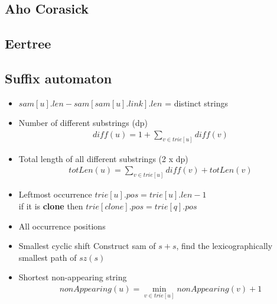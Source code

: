 \subsection{Aho Corasick }

\subsection{Eertree }

\subsection{Suffix automaton }

\vspace{-5pt}

\begin{itemize}[noitemsep]
  \item 
  $sam[u].len- sam[sam[u].link].len$ = distinct strings

  \item Number of different substrings (dp) 
  \begin{gather*}
    diff(u)=1+\sum_{v \in trie[u]}{diff(v)}
  \end{gather*}

  \item Total length of all different substrings (2 x dp)
  \begin{gather*}
    totLen(u)=\sum_{v \in trie[u]}{diff(v) + totLen(v)}
  \end{gather*}
  
  \item Leftmost occurrence 
  $trie[u].pos = trie[u].len - 1$ \\
  if it is \textbf{clone} then $trie[clone].pos = trie[q].pos$ 
  
  \item All occurrence positions
  
  \item Smallest cyclic shift 
  Construct sam of $s + s$, find the lexicographically smallest path of $sz(s)$
 
  \item Shortest non-appearing string 
  \begin{gather*}
    nonAppearing(u) = \min_{v \in trie[u]}{nonAppearing(v) + 1}
  \end{gather*}
\end{itemize}
